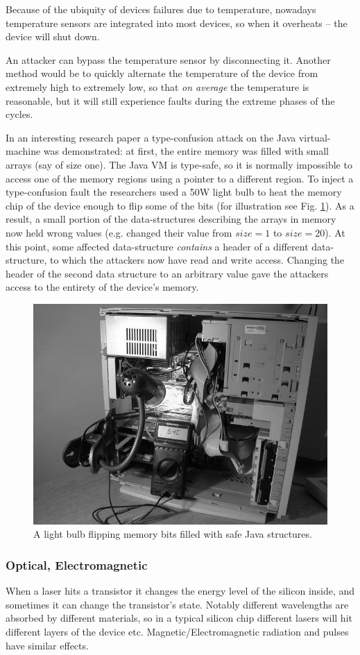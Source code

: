 Because of the ubiquity of devices failures due to temperature, nowadays temperature sensors are integrated into most devices, so when it overheats -- the device will shut down.

An attacker can bypass the temperature sensor by disconnecting it. Another method would be to quickly alternate the temperature of the device from extremely high to extremely low, so that \emph{on average} the temperature is reasonable, but it will still experience faults during the extreme phases of the cycles.

In an interesting research paper \cite{bib:appel} a type-confusion attack on the Java virtual-machine was demonstrated: at first, the entire memory was filled with small arrays (say of size one). The Java VM is type-safe, so it is normally impossible to access one of the memory regions using a pointer to a different region. To inject a type-confusion fault the researchers used a 50W light bulb to heat the memory chip of the device enough to flip some of the bits (for illustration see Fig. \ref{fig:memory_lightbulb}). As a result, a small portion of the data-structures describing the arrays in memory now held wrong values (e.g. changed their value from $size=1$ to $size=20$). At this point, some affected data-structure \emph{contains} a header of a different data-structure, to which the attackers now have read and write access. Changing the header of the second data structure to an arbitrary value gave the attackers access to the entirety of the device's memory.
\begin{figure}[!ht]
	\centering
	\includegraphics[width=0.7\linewidth]{images/ch9/bulb.png}
	\caption{A light bulb flipping memory bits filled with safe Java structures.}
	\label{fig:memory_lightbulb}
\end{figure}

\subsubsection{Optical, Electromagnetic}
When a laser hits a transistor it changes the energy level of the silicon inside, and sometimes it can change the transistor's state. Notably different wavelengths are absorbed by different materials, so in a typical silicon chip different lasers will hit different layers of the device etc. Magnetic/Electromagnetic radiation and pulses have similar effects.

